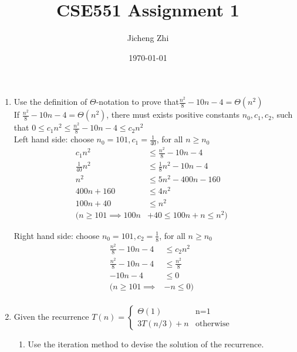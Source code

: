 \documentclass[14pt, a4paper]{article}
\title{CSE551 Assignment 1}
\author{Jicheng Zhi}
\date{\today}
\begin{document}
\maketitle

\begin{enumerate}

\newcommand{\qonefunc}{\frac{n^2}{8} - 10n - 4}
\item Use the definition of $\Theta$-notation to prove that$\qonefunc = \Theta (n^2)$\\

    If $\qonefunc = \Theta (n^2)$, 
    there must exists positive constants $n_0, c_1, c_2$, 
    such that $0 \le  c_1n^2 \le \qonefunc \le c_2n^2$ \\
    
    Left hand side: choose $n_0 = 101, c_1 = \frac{1}{40}$, for all $n \ge n_0$
     \begin{align*}
        c_1n^2 &\le \qonefunc &\\
        \frac{1}{40} n^2 &\le \frac{1}{8} n^2 - 10n - 4 &\\
        n^2 &\le 5 n^2 - 400n - 160 &\\
        400n + 160 &\le 4n^2 &\\
        100n + 40 &\le n^2 & \\
        (n \ge 101 \implies 100n &+ 40 \le 100n + n \le n^2) &
    \end{align*}
    
    Right hand side: choose $n_0=101, c_2=\frac{1}{8}$, for all $n \ge n_0$
    \begin{align*}
        \qonefunc &\le c_2n^2 &\\
        \frac{n^2}{8} - 10n - 4 &\le \frac{n^2}{8} &\\
        -10n - 4 &\le 0 & \\
        (n \ge 101 \implies &-n \le 0) &\\
    \end{align*}
    


\item Given the recurrence
$T(n)=
\begin{cases}
    \Theta(1) & \text{n=1}\\
    3T(n/3)+n & \text{otherwise}
\end{cases}$ \\

    \begin{enumerate}[label={(\arabic*)}]
        \item Use the iteration method to devise the solution of the recurrence. \\
        

\end{enumerate}
\end{enumerate}
\end{document}
